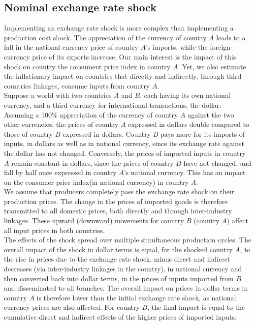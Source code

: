 \documentclass[11pt,a4paper]{article}
\begin{document}
\subsection{Nominal exchange rate shock} \label{subsec:chocchange}

Implementing an exchange rate shock is more complex than implementing a production cost shock. 
The appreciation of the currency of country $A$ leads to a fall in the national currency price of country $A$'s imports, while the foreign-currency price of its exports increase. 
Our main interest is the impact of this shock on country the consument price index in country $A$. 
Yet, we also estimate the inflationary impact on countries that directly and indirectly, through third countries linkages, consume inputs from country $A$.\\
Suppose a world with two countries $A$ and $B$, each having its own national currency, and a third currency for international transactions, the dollar.
Assuming a 100$\%$ appreciation of the currency of country $A$ against the two other currencies, the prices of country $A$ expressed in dollars double compared to those of country $B$ expressed in dollars. 
Country $B$ pays more for its imports of inputs, in dollars as well as in national currency, since its exchange rate against the dollar has not changed. 
Conversely, the prices of imported inputs in country $A$ remain constant in dollars, since the prices of country $B$ have not changed, and fall by half once expressed in country $A$'s national currency. This has an impact on the consumer price index(in national currency) in country $A$.\\
We assume that producers completely pass the exchange rate shock on their production prices. 
The change in the prices of imported goods is therefore transmitted to all domestic prices, both directly and through inter-industry linkages. 
These upward (downward) movements for country $B$ (country $A$) affect all input prices in both countries.\\
The effects of the shock spread over multiple simultaneous production cycles. The overall impact of the shock in dollar terms is equal, for the shocked country $A$, to the rise in prices due to the exchange rate shock, minus direct and indirect decreases (via inter-industry linkages in the country), in national currency and then converted back into dollar terms, in the prices of inputs imported from $B$ and disseminated to all branches. 
The overall impact on prices in dollar terms in country $A$ is therefore lower than the initial exchange rate shock, as national currency prices are also affected. 
For country $B$, the final impact is equal to the cumulative direct and indirect effects of the higher prices of imported inputs.\\
\end{document}
